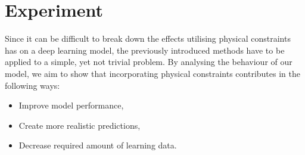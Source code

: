 \label{section:experiment}
\section{Experiment}

Since it can be difficult to break down the effects utilising physical constraints has on a deep learning model, the previously introduced methods have to be applied to a simple, yet not trivial problem. By analysing the behaviour of our model, we aim to show that incorporating physical constraints contributes in the following ways:
\begin{itemize}
	\item Improve model performance,
	\item Create more realistic predictions,
	\item Decrease required amount of learning data.
\end{itemize}


